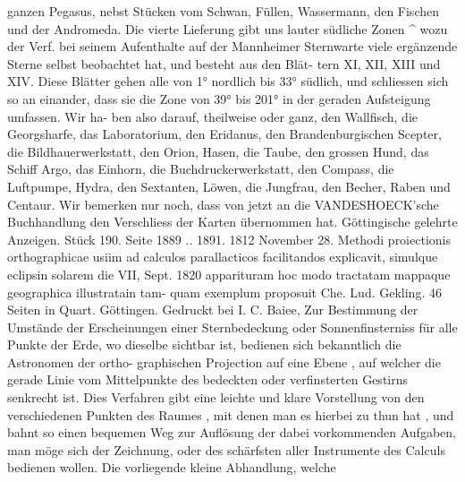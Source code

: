 \documentclass[12pt,a4paper]{article}
\begin{document}
ganzen Pegasus, nebst Stücken vom Schwan, Füllen, Wassermann, den Fischen und der Andromeda.\newline
Die vierte Lieferung gibt uns lauter südliche Zonen \^{} wozu der Verf. bei seinem Aufenthalte auf\newline
der Mannheimer Sternwarte viele ergänzende Sterne selbst beobachtet hat, und besteht aus den Blät-\newline
tern XI, XII, XIII und XIV. Diese Blätter gehen alle von 1° nordlich bis 33° südlich, und schliessen\newline
sich so an einander, dass sie die Zone von 39° bis 201° in der geraden Aufsteigung umfassen. Wir ha-\newline
ben also darauf, theilweise oder ganz, den Wallfisch, die Georgsharfe, das Laboratorium, den Eridanus,\newline
den Brandenburgischen Scepter, die Bildhauerwerkstatt, den Orion, Hasen, die Taube, den grossen\newline
Hund, das Schiff Argo, das Einhorn, die Buchdruckerwerkstatt, den Compass, die Luftpumpe, Hydra,\newline
den Sextanten, Löwen, die Jungfrau, den Becher, Raben und Centaur. Wir bemerken nur noch, dass\newline
von jetzt an die VANDESHOECK'sche Buchhandlung den Verschliess der Karten übernommen hat.\newline
Göttingische gelehrte Anzeigen. Stück 190. Seite 1889 .. 1891. 1812 November 28.\newline
Methodi proiectionis orthographicae usiim ad calculos parallacticos facilitandos explicavit, simulque\newline
eclipsin solarem die VII, Sept. 1820 apparituram hoc modo tractatam mappaque geographica illustratain tam-\newline
quam exemplum proposuit Che. Lud. Gekling. 46 Seiten in Quart. Göttingen. Gedruckt bei I. C. Baiee,\newline
Zur Bestimmung der Umstände der Erscheinungen einer Sternbedeckung oder Sonnenfinsterniss\newline
für alle Punkte der Erde, wo dieselbe sichtbar ist, bedienen sich bekanntlich die Astronomen der ortho-\newline
graphischen Projection auf eine Ebene , auf welcher die gerade Linie vom Mittelpunkte des bedeckten\newline
oder verfinsterten Gestirns senkrecht ist. Dies Verfahren gibt eine leichte und klare Vorstellung von\newline
den verschiedenen Punkten des Raumes , mit denen man es hierbei zu thun hat , und bahnt so einen\newline
bequemen Weg zur Auflösung der dabei vorkommenden Aufgaben, man möge sich der Zeichnung, oder\newline
des schärfsten aller Instrumente des Calculs bedienen wollen. Die vorliegende kleine Abhandlung, welche\newline
\end{document}
